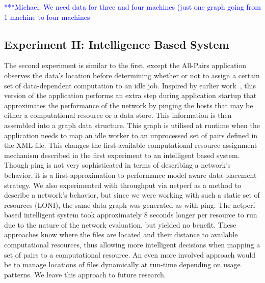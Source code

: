 \documentclass{rspublic}
\newcommand{\micnote}[1]{ {\textcolor{blue} { ***Michael: #1 }}}
\newcommand{\betynote}[1]{ {\textcolor{orange} { ***Bety: #1 }}}
\newcommand{\jhanote}[1]{} \newcommand{\micnote}[1]{}\newcommand{\betynote}[1]{} \newcommand{\fixme}[1]{}
\begin{document}

\jhanote{We need data for compute (comparison) and I/O (only) for
different data-set sizes} \micnote{We need data for three and four
machines (just one graph going from 1 machine to four machines}

\subsection{Experiment II: Intelligence Based System}
The second experiment is similar to the first, except the All-Pairs
application observes the data's location before determining whether or
not to assign a certain set of data-dependent computation to an idle
job. Inspired by earlier work~\citep{netperf}, this version of the
application performs an extra step during application startup that
approximates the performance of the network by pinging the hosts that
may be either a computational resource or a data store. This
information is then assembled into a graph data structure. This graph
is utilised at runtime when the application needs to map an idle worker
to an unprocessed set of pairs defined in the XML file. This changes the
first-available computational resource assignment mechanism described in
the first experiment to an intelligent based system. Though ping is not
very sophisticated in terms of describing a network's behavior, it is a
first-approximation to performance model aware data-placement strategy.
We also experimented with throughput via netperf \citep{netperf_web} as
a method to describe a network's behavior, but since we were working
with such a static set of resources (LONI), the same data graph was
generated as with ping. The netperf-based intelligent system took
approximately 8 seconds longer per resource to run due to the nature of
the network evaluation, but yielded no benefit. These approaches know
where the files are located and their distance to available
computational resources, thus allowing more intelligent decisions when
mapping a set of pairs to a computational resource. An even more
involved approach would be to manage locations of files dynamically at
run-time depending on usage patterns. We leave this approach to future
research.

\end{document}
